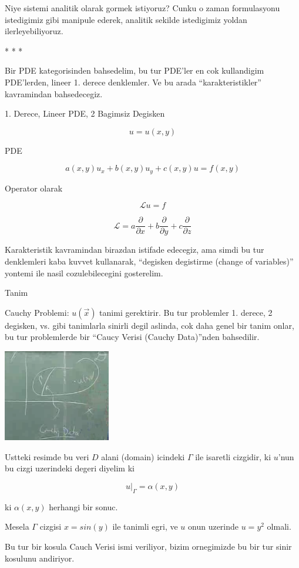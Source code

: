 \documentclass[12pt,fleqn]{article}\usepackage{../common}
\begin{document}
Niye sistemi analitik olarak gormek istiyoruz? Cunku o zaman formulasyonu
istedigimiz gibi manipule ederek, analitik sekilde istedigimiz yoldan
ilerleyebiliyoruz.

* * *

Bir PDE kategorisinden bahsedelim, bu tur PDE'ler en cok kullandigim
PDE'lerden, lineer 1. derece denklemler. Ve bu arada ``karakteristikler''
kavramindan bahsedecegiz. 

1. Derece, Lineer PDE, 2 Bagimsiz Degisken

\[ u = u(x,y) \]

PDE

\[ a(x,y)u_x + b(x,y)u_y + c(x,y)u = f(x,y) \]

Operator olarak 

\[ \mathcal{L}u = f \]

\[ \mathcal{L} = a \frac{\partial }{\partial x} +
b \frac{\partial }{\partial y} +
c \frac{\partial }{\partial z} 
\]

Karakteristik kavramindan birazdan istifade edecegiz, ama simdi bu tur
denklemleri kaba kuvvet kullanarak, ``degisken degistirme (change of
variables)'' yontemi ile nasil cozulebilecegini gosterelim. 

Tanim

Cauchy Problemi: $u(\vec{x})$ tanimi gerektirir. Bu tur problemler
1. derece, 2 degisken, vs. gibi tanimlarla sinirli degil aslinda, cok daha
genel bir tanim onlar, bu tur problemlerde bir ``Caucy Verisi (Cauchy
Data)''nden bahsedilir.

\includegraphics[height=4cm]{1_11.png}

Ustteki resimde bu veri $D$ alani (domain) icindeki $\Gamma$ ile isaretli
cizgidir, ki $u$'nun bu cizgi uzerindeki degeri diyelim ki

\[ u|_{\Gamma} = \alpha(x,y) \]

ki $\alpha(x,y)$ herhangi bir sonuc. 

Mesela $\Gamma$ cizgisi $x=sin(y)$ ile tanimli egri, ve $u$ onun uzerinde
$u=y^2$ olmali.

Bu tur bir kosula Cauch Verisi ismi veriliyor, bizim ornegimizde bu bir tur
sinir kosulunu andiriyor. 
\end{document}

